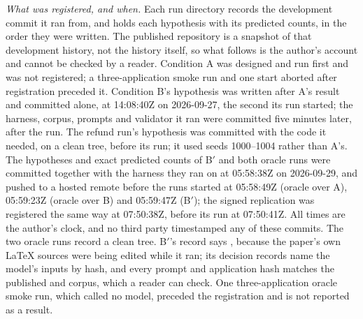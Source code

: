 \smallskip\noindent\emph{What was registered, and when.} Each run directory
records the development commit it ran from, and 
holds each hypothesis with its predicted counts, in the order they were written.
The published repository is a snapshot of that development history, not the
history itself, so what follows is the author's account and cannot be checked
by a reader. Condition A was designed and run first and was not registered; a
three-application smoke run and one start aborted after registration preceded
it. Condition B's hypothesis was written after A's result and committed alone,
at 14:08:40Z on 2026-09-27, the second its run started; the harness, corpus,
prompts and validator it ran were committed five minutes later, after the run.
The refund run's hypothesis was committed with the code it needed, on a clean
tree, before its run; it used seeds 1000--1004 rather than A's. The hypotheses
and exact predicted counts of B$'$ and both oracle runs were committed together
with the harness they ran on at 05:58:38Z on 2026-09-29, and pushed to a hosted
remote before the runs started at 05:58:49Z (oracle over A), 05:59:23Z (oracle
over B) and 05:59:47Z (B$'$); the signed replication was registered the same
way at 07:50:38Z, before its run at 07:50:41Z. All times are the author's clock,
and no third party timestamped any of these commits. The two oracle runs record
a clean tree. B$'$'s record says , because the paper's own LaTeX
sources were being edited while it ran; its decision records name the model's
inputs by hash, and every prompt and application hash matches the published
 and corpus, which a reader can check. One three-application
oracle smoke run, which called no model, preceded the registration and is not
reported as a result.
